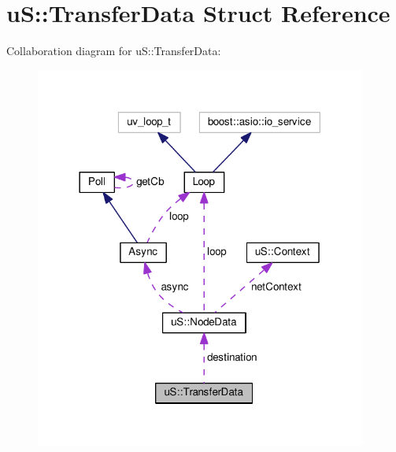 \hypertarget{structu_s_1_1_transfer_data}{}\section{uS\+:\+:Transfer\+Data Struct Reference}
\label{structu_s_1_1_transfer_data}


Collaboration diagram for uS\+:\+:Transfer\+Data\+:
\nopagebreak
\begin{figure}[H]
\begin{center}
\leavevmode
\includegraphics[width=309pt]{structu_s_1_1_transfer_data__coll__graph}
\end{center}
\end{figure}
